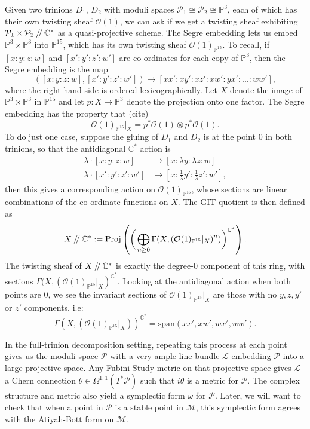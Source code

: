\documentclass[]{article}
\newcommand{\C}{\mathbb{C}}
\newcommand{\OO}{\mathcal{O}}
\newcommand{\LL}{\mathcal{L}}
\newcommand{\MM}{\mathcal{M}}
\newcommand{\cP}{\mathcal{P}}
\newcommand{\PP}{\mathbb{P}}
\newcommand{\sslash}{\mathbin{/\mkern-4mu/}}
\begin{document}
	Given two trinions $D_1$, $D_2$ with moduli spaces $\cP_1 \cong \cP_2 \cong \PP^3$, each of which has their own twisting sheaf $\OO(1)$, we can ask if we get a twisting sheaf exhibiting $\cP_1 \times \cP_2 \sslash \C^\ast$ as a quasi-projective scheme. The Segre embedding lets us embed $\PP^3 \times \PP^3$ into $\PP^{15}$, which has its own twisting sheaf $\OO(1)_{\PP^{15}}$. To recall, if $[x:y:z:w]$ and $[x':y':z':w']$ are co-ordinates for each copy of $\PP^3$, then the Segre embedding is the map
	\begin{equation}
		([x:y:z:w], [x':y':z':w']) \to [xx':xy':xz':xw':yx':...:ww'],
	\end{equation}
	where the right-hand side is ordered lexicographically. Let $X$ denote the image of $\PP^3\times \PP^3$ in $\PP^{15}$ and let $p:X\to \PP^3$ denote the projection onto one factor. The Segre embedding has the property that (cite)
	\begin{equation}
		\OO(1)_{\PP^{15}}|_X = p^\ast \OO(1) \otimes p^\ast \OO(1).
	\end{equation}
	To do just one case, suppose the gluing of $D_1$ and $D_2$ is at the point $0$ in both trinions, so that the antidiagonal $\C^\ast$ action is
	\begin{align*}
		\lambda \cdot [x:y:z:w] &\to [x:\lambda y:\lambda z: w]\\
		\lambda \cdot [x':y':z':w']&\to [x:\frac{1}{\lambda}y': \frac{1}{\lambda}z':w'],
	\end{align*}
	then this gives a corresponding action on $\OO(1)_{\PP^{15}}$, whose sections are linear combinations of the co-ordinate functions on $X$. The GIT quotient is then defined as
	\begin{equation}
		X\sslash \C^\ast := \text{Proj}\left(\bigg(\bigoplus_{n\geq 0} \Gamma(X, \left(\OO(1)_{\PP^{15}}|_X\right)^n)\bigg)^{\C^\ast}\right).
	\end{equation}
	The twisting sheaf of $X\sslash \C^\ast$ is exactly the degree-0 component of this ring, with sections $\Gamma(X, \left(\OO(1)_{\PP^{15}}|_X\right)^{\C^\ast}.$ Looking at the antidiagonal action when both points are $0$, we see the invariant sections of $\OO(1)_{\PP^{15}}|_X$ are those with no $y,z,y'$ or $z'$ components, i.e:
	\begin{equation}
		\Gamma(X, \left(\OO(1)_{\PP^{15}}|_X\right))^{\C^\ast} = \text{span}(xx',xw',wx',ww').
	\end{equation}
	
	In the full-trinion decomposition setting, repeating this process at each point gives us the moduli space $\cP$ with a very ample line bundle $\LL$ embedding $\cP$ into a large projective space. Any Fubini-Study metric on that projective space gives $\LL$ a Chern connection $\theta \in \Omega^{1,1}(T^\ast \cP)$ such that $i\theta$ is a metric for $\cP$. The complex structure and metric also yield a symplectic form $\omega$ for $\cP$. Later, we will want to check that when a point in $\cP$ is a stable point in $\MM$, this symplectic form agrees with the Atiyah-Bott form on $\MM$.
\end{document}
